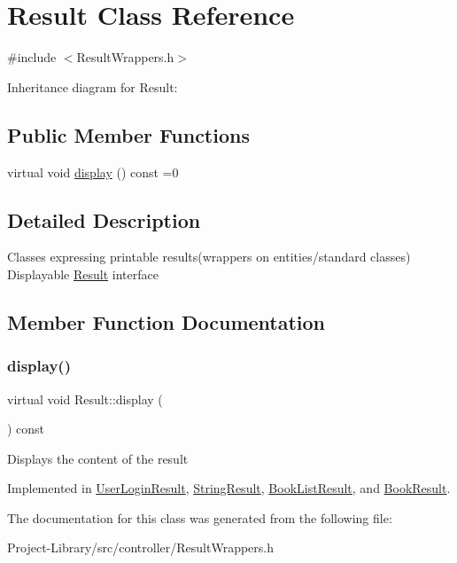 \hypertarget{classResult}{}\section{Result Class Reference}
\label{classResult}


{\ttfamily \#include $<$Result\+Wrappers.\+h$>$}



Inheritance diagram for Result\+:
\subsection*{Public Member Functions}
\begin{DoxyCompactItemize}
\item 
virtual void \hyperlink{classResult_a625729bae46b53c231feb50a91b1390e}{display} () const =0
\end{DoxyCompactItemize}


\subsection{Detailed Description}
Classes expressing printable results(wrappers on entities/standard classes) Displayable \hyperlink{classResult}{Result} interface 

\subsection{Member Function Documentation}
\mbox{\label{classResult_a625729bae46b53c231feb50a91b1390e}} 
\subsubsection{\texorpdfstring{display()}{display()}}
{\footnotesize\ttfamily virtual void Result\+::display (\begin{DoxyParamCaption}{ }\end{DoxyParamCaption}) const\hspace{0.3cm}{\ttfamily [pure virtual]}}

Displays the content of the result 

Implemented in \hyperlink{classUserLoginResult_a6257cc743f692c4914950904ebdc723d}{User\+Login\+Result}, \hyperlink{classStringResult_a8500687e59dcf646cf3dbdef33ab8703}{String\+Result}, \hyperlink{classBookListResult_afecd81f393580cf102e694796d6d3ab7}{Book\+List\+Result}, and \hyperlink{classBookResult_a091c20c6e1c90f30020a4b7298602680}{Book\+Result}.



The documentation for this class was generated from the following file\+:\begin{DoxyCompactItemize}
\item 
Project-\/\+Library/src/controller/Result\+Wrappers.\+h\end{DoxyCompactItemize}
